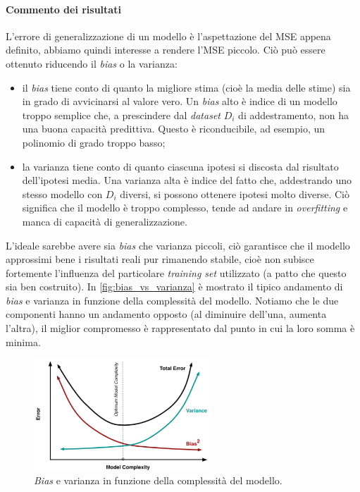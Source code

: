 \paragraph{Commento dei risultati}
L'errore di generalizzazione di un modello è l'aspettazione del MSE appena definito, abbiamo quindi interesse a rendere l'MSE piccolo. Ciò può essere ottenuto riducendo il \emph{bias} o la varianza:
\begin{itemize}
\item il \emph{bias} tiene conto di quanto la migliore stima (cioè la media delle stime) sia in grado di avvicinarsi al valore vero. Un \emph{bias} alto è indice di un modello troppo semplice che, a prescindere dal \emph{dataset} $D_i$ di addestramento, non ha una buona capacità predittiva. Questo è riconducibile, ad esempio, un polinomio di grado troppo basso;
\item la varianza tiene conto di quanto ciascuna ipotesi si discosta dal risultato dell'ipotesi media. Una varianza alta è indice del fatto che, addestrando uno stesso modello con $D_i$ diversi, si possono ottenere ipotesi molto diverse. Ciò significa che il modello è troppo complesso, tende ad andare in \emph{overfitting} e manca di capacità di generalizzazione.
\end{itemize}


L'ideale sarebbe avere sia \emph{bias} che varianza piccoli, ciò garantisce che il modello approssimi bene i risultati reali pur rimanendo stabile, cioè non subisce fortemente l'influenza del particolare \emph{training set} utilizzato (a patto che questo sia ben costruito). In \autoref{fig:bias_vs_varianza} è mostrato il tipico andamento di \emph{bias} e varianza in funzione della complessità del modello. Notiamo che le due componenti hanno un andamento opposto (al diminuire dell'una, aumenta l'altra), il miglior compromesso è rappresentato dal punto in cui la loro somma è minima.

\begin{figure}[tbp]
\centering
  \includegraphics[width=0.6\textwidth]{images/bias_vs_var}
  \caption{\emph{Bias} e varianza in funzione della complessità del modello.}
  \label{fig:bias_vs_varianza}
\end{figure}


